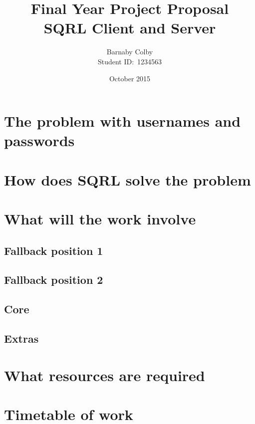 \documentclass[a4paper]{article}
\begin{document}
\title{Final Year Project Proposal\\SQRL Client and Server}
\author{Barnaby Colby\\
Student ID:\ 1234563}
\date{October 2015}
\maketitle



\section*{The problem with usernames and passwords} 
\section*{How does SQRL solve the problem} 
\section*{What will the work involve} 
    \subsection*{Fallback position 1} 
    \subsection*{Fallback position 2} 
    \subsection*{Core} 
    \subsection*{Extras}
\section*{What resources are required}
\section*{Timetable of work}
\end{document}
